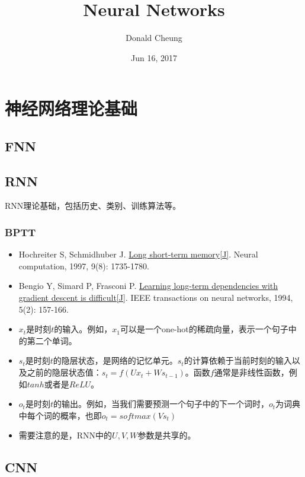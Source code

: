 \documentclass[UTF8,11pt,a4paper]{ctexart}
\begin{document}
\setlength{\baselineskip}{20pt}
\title{Neural Networks}
\author{Donald Cheung}
\date{Jun 16, 2017}
\maketitle
\tableofcontents

\section{神经网络理论基础}
\subsection{FNN}

\subsection{RNN}
RNN理论基础，包括历史、类别、训练算法等。
\subsubsection{BPTT}
\begin{itemize}
\item Hochreiter S, Schmidhuber J. \href{http://web.eecs.utk.edu/~itamar/courses/ECE-692/Bobby_paper1.pdf}{Long short-term memory[J]}. Neural computation, 1997, 9(8): 1735-1780.
\item Bengio Y, Simard P, Frasconi P. \href{http://www-dsi.ing.unifi.it/~paolo/ps/tnn-94-gradient.pdf}{Learning long-term dependencies with gradient descent is difficult[J]}. IEEE transactions on neural networks, 1994, 5(2): 157-166.
\end{itemize}

\begin{itemize}
\item $x_t$是时刻$t$的输入。例如，$x_1$可以是一个one-hot的稀疏向量，表示一个句子中的第二个单词。
\item $s_t$是时刻$t$的隐层状态，是网络的记忆单元。$s_t$的计算依赖于当前时刻的输入以及之前的隐层状态值：$s_t=f(Ux_t+Ws_{t-1})$。函数$f$通常是非线性函数，例如$tanh$或者是$ReLU$。
\item $o_t$是时刻$t$的输出。例如，当我们需要预测一个句子中的下一个词时，$o_t$为词典中每个词的概率，也即$o_t=softmax(Vs_t)$
\item 需要注意的是，RNN中的$U,V,W$参数是共享的。
\end{itemize}




\subsection{CNN}
\end{document}
